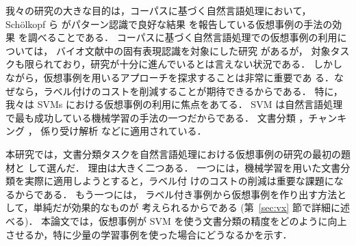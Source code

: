 我々の研究の大きな目的は，コーパスに基づく自然言語処理において，
Sch\"{o}lkopf ら  がパターン認識で良好な結果
を報告している仮想事例の手法の効果
を調べることである．
コーパスに基づく自然言語処理での仮想事例の利用については，
バイオ文献中の固有表現認識を対象にした研究 \cite{Yi2004} があるが，
対象タスクも限られており，研究が十分に進んでいるとは言えない状況である．
しかしながら，仮想事例を用いるアプローチを探求することは非常に重要であ
る．なぜなら，ラベル付けのコストを削減することが期待できるからである．
特に，我々は SVMs \cite{Vapnik1995}における仮想事例の利用に焦点をあてる．
SVM は自然言語処理で最も成功している機械学習の手法の一つだからである．
文書分類 \cite{Joachims1998,Dumais1998}，チャンキング \cite{Kudo2001}，
係り受け解析 \cite{Kudo2002}などに適用されている．

本研究では，文書分類タスクを自然言語処理における仮想事例の研究の最初の題材と
して選んだ．
理由は大きく二つある．
一つには，機械学習を用いた文書分類を実際に適用しようとすると，ラベル付
けのコストの削減は重要な課題になるからである．
もう一つには，
ラベル付き事例から仮想事例を作り出す方法として，単純だが効果的なものが
考えられるからである (第~\ref{sec:vx} 節で詳細に述べる)．
本論文では，仮想事例が SVM を使う文書分類の精度をどのように向上させるか，特に少量の学習事例を使った場合にどうなるかを示す．

